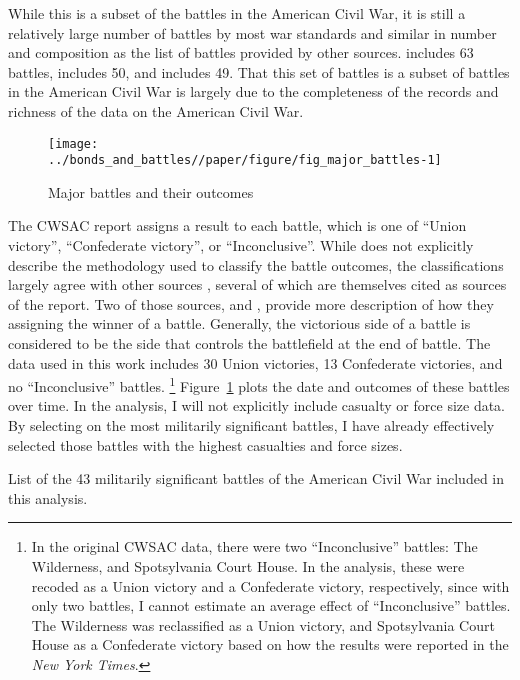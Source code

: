 While this is a subset of the battles in the American Civil War, it is still a relatively large number of battles by most war standards and similar in number and composition as the list of battles provided by other sources.
\textcite{Livermore1900} includes 63 battles, \textcite{Bodart1908} includes 50, and \textcite{cdb90} includes 49.
That this set of battles is a subset of battles in the  American Civil War is largely due to the completeness of the records and richness of the data on the American Civil War.

\begin{figure}[!htpb]
  \centering
  \texttt{[image: ../bonds\_and\_battles//paper/figure/fig\_major\_battles-1]}
  \caption{Major battles and their outcomes}
  \label{bonds:fig:major_battles}
\end{figure}

The CWSAC report \parencite{CWSAC1993b} assigns a result to each battle, which is one of ``Union victory'', ``Confederate victory'', or ``Inconclusive''.
While \textcite{CWSAC1993} does not explicitly describe the methodology used to classify the battle outcomes, the classifications largely agree with other sources \parencites{fox1898regimental}{Livermore1900}{Bodart1908}{cdb90}, several of which are themselves cited as sources of the report.
Two of those sources, \textcite{fox1898regimental} and \textcite{Livermore1900}, provide more description of how they assigning the winner of a battle.
Generally, the victorious side of a battle is considered to be the side that controls the battlefield at the end of battle.
The data used in this work includes 30 Union victories, 13 Confederate victories, and no ``Inconclusive'' battles.
\footnote{
  In the original CWSAC data, there were two ``Inconclusive'' battles: The Wilderness, and Spotsylvania Court House.
  In the analysis, these were recoded as a Union victory and a Confederate victory, respectively, since with only two battles, I cannot estimate an average effect of ``Inconclusive'' battles.
  The Wilderness was reclassified as a Union victory, and Spotsylvania Court House as a Confederate victory based on how the results were reported in the \textit{New York Times}.
}
Figure~\ref{bonds:fig:major_battles} plots the date and outcomes of these battles over time.
In the analysis, I will not explicitly include casualty or force size data.
By selecting on the most militarily significant battles, I have already effectively selected those battles with the highest casualties and force sizes.

\begin{table}
  \centering
  
  \caption[List of the militarily significant battles of the American Civil War]{List of the 43 militarily significant battles of the American Civil War included in this analysis.}
  \label{bonds:tab:battles}
\end{table}


